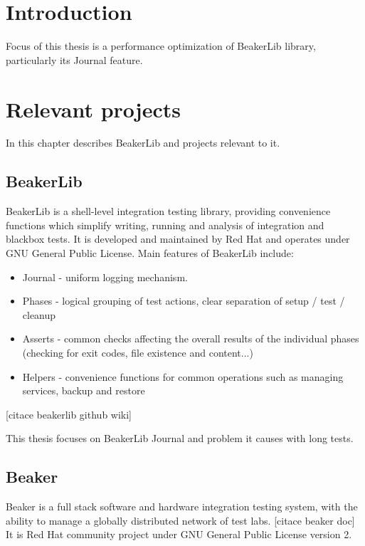 
\chapter{Introduction}

Focus of this thesis is a performance optimization of BeakerLib library, particularly its Journal feature. 

\chapter{Relevant projects}

In this chapter describes BeakerLib and projects relevant to it.

\section{BeakerLib}

BeakerLib is a shell-level integration testing library, providing convenience functions which simplify writing, running and analysis of integration and blackbox tests. 
It is developed and maintained by Red Hat and operates under GNU General Public License.
Main features of BeakerLib include:
\begin{itemize}
\item Journal - uniform logging mechanism. 
\item Phases - logical grouping of test actions, clear separation of setup / test / cleanup
\item Asserts - common checks affecting the overall results of the individual phases (checking for exit codes, file existence and content...)
\item Helpers - convenience functions for common operations such as managing services, backup and restore 
\end{itemize}
[citace beakerlib github wiki]

This thesis focuses on BeakerLib Journal and problem it causes with long tests.


\section{Beaker}

Beaker is a full stack software and hardware integration testing system, with the ability to manage a globally distributed network of test labs.  [citace beaker doc] It is Red Hat community project under GNU General Public License version 2.

